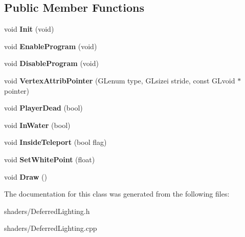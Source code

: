\subsection*{\-Public \-Member \-Functions}
\begin{DoxyCompactItemize}
\item 
\hypertarget{classDeferredLighting_a7f972ae0f3b0d0abf541ff828fb29271}{void {\bfseries \-Init} (void)}\label{classDeferredLighting_a7f972ae0f3b0d0abf541ff828fb29271}

\item 
\hypertarget{classDeferredLighting_adbf5ea22dfe764a11fc5bcfbeb44f6e4}{void {\bfseries \-Enable\-Program} (void)}\label{classDeferredLighting_adbf5ea22dfe764a11fc5bcfbeb44f6e4}

\item 
\hypertarget{classDeferredLighting_a9e234f5c7f64a8451928a4e5cf9384ec}{void {\bfseries \-Disable\-Program} (void)}\label{classDeferredLighting_a9e234f5c7f64a8451928a4e5cf9384ec}

\item 
\hypertarget{classDeferredLighting_aea9c2f20b4b3f1bf31bbaf53f4bb915b}{void {\bfseries \-Vertex\-Attrib\-Pointer} (\-G\-Lenum type, \-G\-Lsizei stride, const \-G\-Lvoid $\ast$pointer)}\label{classDeferredLighting_aea9c2f20b4b3f1bf31bbaf53f4bb915b}

\item 
\hypertarget{classDeferredLighting_afe628eaa8d7bd6025cfceae03cc0d181}{void {\bfseries \-Player\-Dead} (bool)}\label{classDeferredLighting_afe628eaa8d7bd6025cfceae03cc0d181}

\item 
\hypertarget{classDeferredLighting_aee0f2239692678c0f6a5cd16dda8a6ef}{void {\bfseries \-In\-Water} (bool)}\label{classDeferredLighting_aee0f2239692678c0f6a5cd16dda8a6ef}

\item 
\hypertarget{classDeferredLighting_aab381b529dd77f5b6a8cc392a6ae5599}{void {\bfseries \-Inside\-Teleport} (bool flag)}\label{classDeferredLighting_aab381b529dd77f5b6a8cc392a6ae5599}

\item 
\hypertarget{classDeferredLighting_a57271d2a1f3d1d0b20b19b7c1459a501}{void {\bfseries \-Set\-White\-Point} (float)}\label{classDeferredLighting_a57271d2a1f3d1d0b20b19b7c1459a501}

\item 
\hypertarget{classDeferredLighting_a0a34210e2cee2b77afb1805e63ef50b4}{void {\bfseries \-Draw} ()}\label{classDeferredLighting_a0a34210e2cee2b77afb1805e63ef50b4}

\end{DoxyCompactItemize}


\-The documentation for this class was generated from the following files\-:\begin{DoxyCompactItemize}
\item 
shaders/\-Deferred\-Lighting.\-h\item 
shaders/\-Deferred\-Lighting.\-cpp\end{DoxyCompactItemize}
